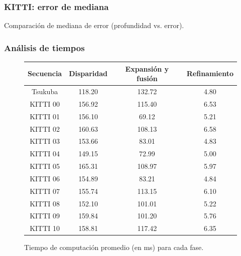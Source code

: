 \begin{frame}
	\frametitle{KITTI: error de mediana}
	\centering
	Comparación de mediana de error (profundidad vs. error).
	\vspace{-1em}
	\begin{figure}[!htb]
		\captionsetup{justification=centering}
		\hfil
	\end{figure}
\end{frame}


\begin{frame}
	\frametitle{Análisis de tiempos}
	\vspace{-0.7em}
	\begin{center}
	\begin{figure}[tbh]
	\begin{centering}
	\begin{tabular}{cccc}
		\toprule 
		Secuencia & Disparidad & Expansión y fusión & Refinamiento\tabularnewline
		\midrule
		\midrule 
		Tsukuba & 118.20 & 132.72 & 4.80\tabularnewline
		\midrule 
		KITTI 00 & 156.92 & 115.40 & 6.53\tabularnewline
		\midrule 
		KITTI 01 & 156.10 & 69.12 & 5.21\tabularnewline
		\midrule 
		KITTI 02 & 160.63 & 108.13 & 6.58\tabularnewline
		\midrule 
		KITTI 03 & 153.66 & 83.01 & 4.83\tabularnewline
		\midrule 
		KITTI 04 & 149.15 & 72.99 & 5.00\tabularnewline
		\midrule 
		KITTI 05 & 165.31 & 108.97 & 5.97\tabularnewline
		\midrule 
		KITTI 06 & 154.89 & 83.21 & 4.84\tabularnewline
		\midrule 
		KITTI 07 & 155.74 & 113.15 & 6.10\tabularnewline
		\midrule 
		KITTI 08 & 152.10 & 101.01 & 5.22\tabularnewline
		\midrule 
		KITTI 09 & 159.84 & 101.20 & 5.76\tabularnewline
		\midrule 
		KITTI 10 & 158.81 & 117.42 & 6.35\tabularnewline
		\bottomrule
	\end{tabular}
	\par\end{centering}
	\centering
	\caption{Tiempo de computación promedio (en ms) para cada fase.}
	\end{figure}
	\par\end{center}
\end{frame}


